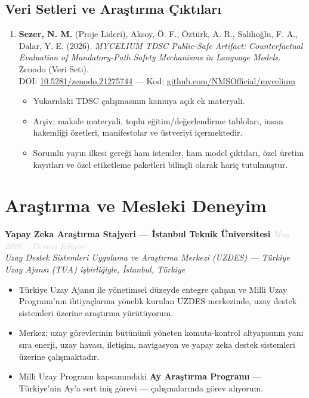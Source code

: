 \documentclass[11pt,a4paper]{article}
\newcommand{\blueitem}[1]{\textcolor{subtitleblue}{\textbf{#1}}}
\newcommand{\daterange}[1]{\hfill \textcolor{lightgray}{\textit{#1}}}
\begin{document}
\subsection*{Veri Setleri ve Araştırma Çıktıları}
\begin{enumerate}[leftmargin=*, itemsep=0.35em, topsep=2pt, start=9]
    \item \textbf{Sezer, N. M.} (Proje Lideri), Aksoy, Ö. F., Öztürk, A. R., Salihoğlu, F. A., Dalar, Y. E. (2026). \textit{MYCELIUM TDSC Public-Safe Artifact: Counterfactual Evaluation of Mandatory-Path Safety Mechanisms in Language Models.} Zenodo (Veri Seti). \\
    DOI: \href{https://doi.org/10.5281/zenodo.21275744}{10.5281/zenodo.21275744} --- Kod: \href{https://github.com/NMSOfficial/mycelium}{github.com/NMSOfficial/mycelium}
    \begin{itemize}
        \item Yukarıdaki TDSC çalışmasının kamuya açık ek materyali.
        \item Arşiv; makale materyali, toplu eğitim/değerlendirme tabloları, insan hakemliği özetleri, manifestolar ve üstveriyi içermektedir.
        \item Sorumlu yayın ilkesi gereği ham istemler, ham model çıktıları, özel üretim kayıtları ve özel etiketleme paketleri bilinçli olarak hariç tutulmuştur.
    \end{itemize}
\end{enumerate}

\section*{Araştırma ve Mesleki Deneyim}

\blueitem{Yapay Zeka Araştırma Stajyeri --- İstanbul Teknik Üniversitesi} \daterange{May 2026 -- Devam Ediyor}\\
\textit{Uzay Destek Sistemleri Uygulama ve Araştırma Merkezi (UZDES) --- Türkiye Uzay Ajansı (TUA) işbirliğiyle, İstanbul, Türkiye}
\begin{itemize}
    \item Türkiye Uzay Ajansı ile yönetimsel düzeyde entegre çalışan ve Milli Uzay Programı'nın ihtiyaçlarına yönelik kurulan UZDES merkezinde, uzay destek sistemleri üzerine araştırma yürütüyorum.
    \item Merkez; uzay görevlerinin bütününü yöneten komuta-kontrol altyapısının yanı sıra enerji, uzay havası, iletişim, navigasyon ve yapay zeka destek sistemleri üzerine çalışmaktadır.
    \item Milli Uzay Programı kapsamındaki \textbf{Ay Araştırma Programı} --- Türkiye'nin Ay'a sert iniş görevi --- çalışmalarında görev alıyorum.
\end{itemize}
\end{document}
